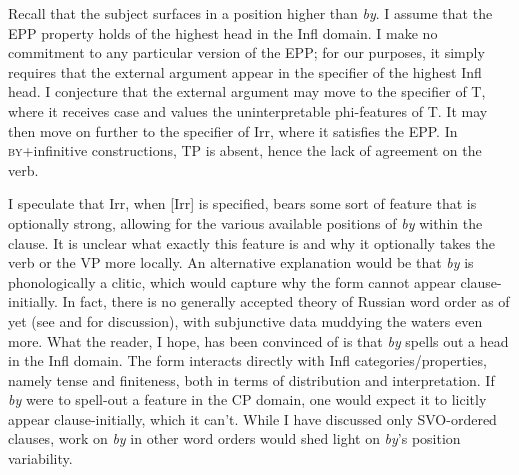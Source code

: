 \documentclass[output=paper,
modfonts,
newtxmath,
hidelinks,
]{langscibook}
\begin{document}
\ea \label{10:ex23}
\z\z

\noindent Recall that the subject surfaces in a position higher than \textit{by}. I assume that the EPP property holds of the highest head in the Infl domain. I make no commitment to any particular version of the EPP; for our purposes, it simply requires that the external argument appear in the specifier of the highest Infl head. I conjecture that the external argument may move to the specifier of T, where it receives case and values the uninterpretable phi-features of T. It may then move on further to the specifier of Irr, where it satisfies the EPP. In \textsc{by}+infinitive constructions, TP is absent, hence the lack of agreement on the verb.

I speculate that Irr, when [Irr] is specified, bears some sort of feature that is optionally strong, allowing for the various available positions of \textit{by} within the clause. It is unclear what exactly this feature is and why it optionally takes the verb or the VP more locally. An alternative explanation would be that \textit{by} is phonologically a clitic, which would capture why the form cannot appear clause-initially. In fact, there is no generally accepted theory of Russian word order as of yet (see \citealt{KallestinovaSlabakova2008} and \citealt{Bailyn2011} for discussion), with subjunctive data muddying the waters even more. What the reader, I hope, has been convinced of is that \textit{by} spells out a head in the Infl domain. The form interacts directly with Infl categories/properties, namely tense and finiteness, both in terms of distribution and interpretation. If \textit{by} were to spell-out a feature in the CP domain, one would expect it to licitly appear clause-initially, which it can’t. While I have discussed only SVO-ordered clauses, work on \textit{by} in other word orders would shed light on \textit{by}’s position variability.
\end{document}
